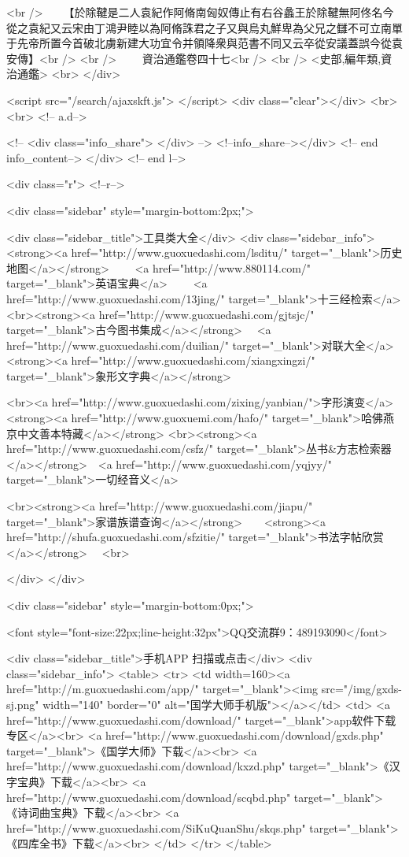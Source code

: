 <br />
　　【於除鞬是二人袁紀作阿脩南匈奴傳止有右谷蠡王於除鞬無阿佟名今從之袁紀又云宋由丁鴻尹睦以為阿脩誅君之子又與烏丸鮮卑為父兄之讎不可立南單于先帝所置今首破北虜新建大功宜令并領降衆與范書不同又云卒從安議蓋誤今從袁安傳】<br />
<br />
　　資治通鑑卷四十七<br />
<br />
<史部,編年類,資治通鑑>  <br>
   </div> 

<script src="/search/ajaxskft.js"> </script>
 <div class="clear"></div>
<br>
<br>
 <!-- a.d-->

 <!--
<div class="info_share">
</div> 
-->
 <!--info_share--></div>   <!-- end info_content-->
  </div> <!-- end l-->

<div class="r">   <!--r-->



<div class="sidebar"  style="margin-bottom:2px;">

 
<div class="sidebar_title">工具类大全</div>
<div class="sidebar_info">
<strong><a href="http://www.guoxuedashi.com/lsditu/" target="_blank">历史地图</a></strong>　　
<a href="http://www.880114.com/" target="_blank">英语宝典</a>　　
<a href="http://www.guoxuedashi.com/13jing/" target="_blank">十三经检索</a>　
<br><strong><a href="http://www.guoxuedashi.com/gjtsjc/" target="_blank">古今图书集成</a></strong>　
<a href="http://www.guoxuedashi.com/duilian/" target="_blank">对联大全</a>　<strong><a href="http://www.guoxuedashi.com/xiangxingzi/" target="_blank">象形文字典</a></strong>　

<br><a href="http://www.guoxuedashi.com/zixing/yanbian/">字形演变</a>　　<strong><a href="http://www.guoxuemi.com/hafo/" target="_blank">哈佛燕京中文善本特藏</a></strong>
<br><strong><a href="http://www.guoxuedashi.com/csfz/" target="_blank">丛书&方志检索器</a></strong>　<a href="http://www.guoxuedashi.com/yqjyy/" target="_blank">一切经音义</a>　　

<br><strong><a href="http://www.guoxuedashi.com/jiapu/" target="_blank">家谱族谱查询</a></strong>　　<strong><a href="http://shufa.guoxuedashi.com/sfzitie/" target="_blank">书法字帖欣赏</a></strong>　
<br>

</div>
</div>


<div class="sidebar" style="margin-bottom:0px;">

<font style="font-size:22px;line-height:32px">QQ交流群9：489193090</font>


<div class="sidebar_title">手机APP 扫描或点击</div>
<div class="sidebar_info">
<table>
<tr>
	<td width=160><a href="http://m.guoxuedashi.com/app/" target="_blank"><img src="/img/gxds-sj.png" width="140"  border="0" alt="国学大师手机版"></a></td>
	<td>
<a href="http://www.guoxuedashi.com/download/" target="_blank">app软件下载专区</a><br>
<a href="http://www.guoxuedashi.com/download/gxds.php" target="_blank">《国学大师》下载</a><br>
<a href="http://www.guoxuedashi.com/download/kxzd.php" target="_blank">《汉字宝典》下载</a><br>
<a href="http://www.guoxuedashi.com/download/scqbd.php" target="_blank">《诗词曲宝典》下载</a><br>
<a href="http://www.guoxuedashi.com/SiKuQuanShu/skqs.php" target="_blank">《四库全书》下载</a><br>
</td>
</tr>
</table>

